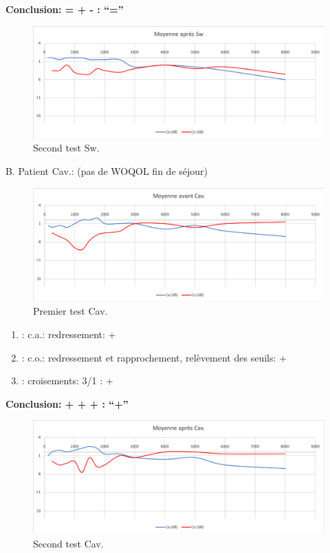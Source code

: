                 \textbf{  Conclusion:  = +  -        : ``=''}

                \begin{figure}
\centering
\includegraphics[width=0.7\linewidth]{images/graphiques/sw_post.png}
\caption[Moyenne OG+OD]{Second test Sw.}
       
\label{groupecontroleimage1}
\end{figure}

B. Patient Cav.: (pas de WOQOL fin de séjour)

\begin{figure}
\centering
\includegraphics[width=0.7\linewidth]{images/graphiques/cav_pre.png}
\caption[Moyenne OG+OD]{Premier test Cav.}
       
\label{groupecontroleimage1}
\end{figure}

	\begin{enumerate}
 		
 		\item : c.a.: redressement: +
                
 		\item : c.o.: redressement et rapprochement, relèvement des seuils: +
 		\item : croisements: 3/1 :  +
                  
                \end{enumerate}

                \textbf{  Conclusion:  + + +       : ``+''}

                \begin{figure}
\centering
\includegraphics[width=0.7\linewidth]{images/graphiques/cav_post.png}
\caption[Moyenne OG+OD]{Second test Cav.}
       
\label{groupecontroleimage1}
                \end{figure}



